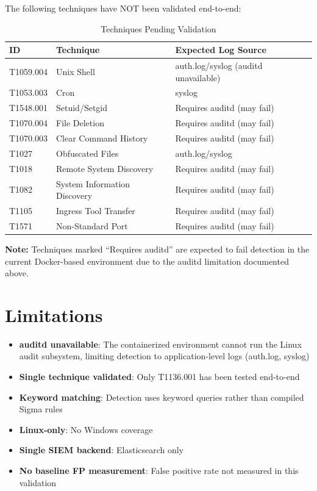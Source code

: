 \documentclass[11pt,a4paper]{article}
\begin{document}
The following techniques have NOT been validated end-to-end:

\begin{table}[H]
    \centering
    \caption{Techniques Pending Validation}
    \label{tab:pending}
    \begin{tabular}{lll}
        \toprule
        \textbf{ID} & \textbf{Technique} & \textbf{Expected Log Source} \\
        \midrule
        T1059.004 & Unix Shell & auth.log/syslog (auditd unavailable) \\
        T1053.003 & Cron & syslog \\
        T1548.001 & Setuid/Setgid & Requires auditd (may fail) \\
        T1070.004 & File Deletion & Requires auditd (may fail) \\
        T1070.003 & Clear Command History & Requires auditd (may fail) \\
        T1027 & Obfuscated Files & auth.log/syslog \\
        T1018 & Remote System Discovery & Requires auditd (may fail) \\
        T1082 & System Information Discovery & Requires auditd (may fail) \\
        T1105 & Ingress Tool Transfer & Requires auditd (may fail) \\
        T1571 & Non-Standard Port & Requires auditd (may fail) \\
        \bottomrule
    \end{tabular}
\end{table}

\textbf{Note:} Techniques marked ``Requires auditd'' are expected to fail detection in the current Docker-based environment due to the auditd limitation documented above.

\section{Limitations}

\begin{itemize}
    \item \textbf{auditd unavailable}: The containerized environment cannot run the Linux audit subsystem, limiting detection to application-level logs (auth.log, syslog)
    \item \textbf{Single technique validated}: Only T1136.001 has been tested end-to-end
    \item \textbf{Keyword matching}: Detection uses keyword queries rather than compiled Sigma rules
    \item \textbf{Linux-only}: No Windows coverage
    \item \textbf{Single SIEM backend}: Elasticsearch only
    \item \textbf{No baseline FP measurement}: False positive rate not measured in this validation
\end{itemize}
\end{document}
